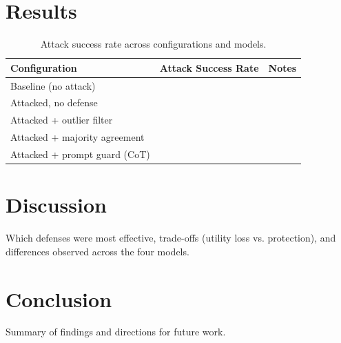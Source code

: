 \documentclass[11pt]{article}
\begin{document}
\section{Results}
\begin{table}[h]
\centering
\begin{tabular}{lcc}
\toprule
Configuration & Attack Success Rate & Notes \\
\midrule
Baseline (no attack) & & \\
Attacked, no defense & & \\
Attacked + outlier filter & & \\
Attacked + majority agreement & & \\
Attacked + prompt guard (CoT) & & \\
\bottomrule
\end{tabular}
\caption{Attack success rate across configurations and models.}
\end{table}

\section{Discussion}
Which defenses were most effective, trade-offs (utility loss vs. protection),
and differences observed across the four models.

\section{Conclusion}
Summary of findings and directions for future work.
\end{document}
